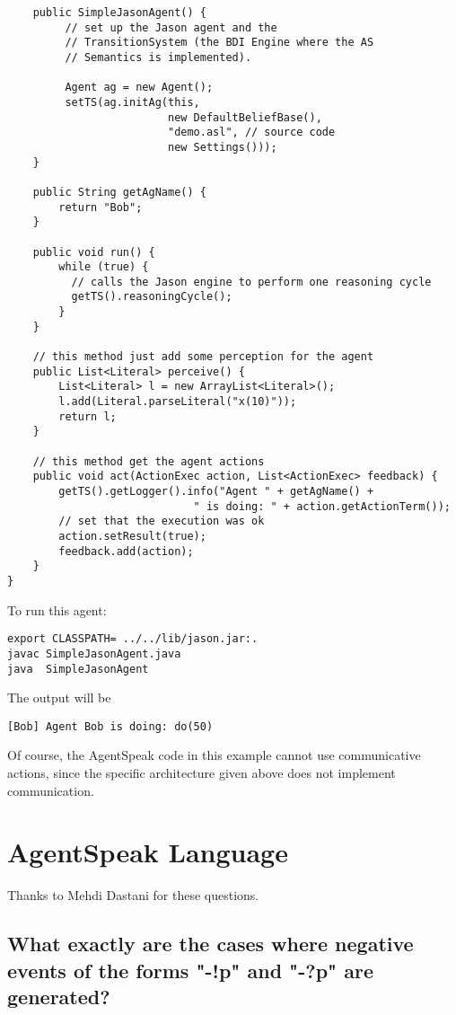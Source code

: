 \documentclass{article}
\begin{document}
\begin{description}
\begin{verbatim}
    public SimpleJasonAgent() {
         // set up the Jason agent and the 
         // TransitionSystem (the BDI Engine where the AS 
         // Semantics is implemented).

         Agent ag = new Agent();
         setTS(ag.initAg(this, 
                         new DefaultBeliefBase(), 
                         "demo.asl", // source code
                         new Settings()));
    }
    
    public String getAgName() {
        return "Bob";
    }

    public void run() {
        while (true) {
          // calls the Jason engine to perform one reasoning cycle
          getTS().reasoningCycle();
        }
    }

    // this method just add some perception for the agent
    public List<Literal> perceive() {
        List<Literal> l = new ArrayList<Literal>();
        l.add(Literal.parseLiteral("x(10)"));
        return l;
    }

    // this method get the agent actions
    public void act(ActionExec action, List<ActionExec> feedback) {
        getTS().getLogger().info("Agent " + getAgName() + 
                             " is doing: " + action.getActionTerm());
        // set that the execution was ok
        action.setResult(true);
        feedback.add(action);
    }
}
\end{verbatim}

To run this agent:
\begin{verbatim}
export CLASSPATH= ../../lib/jason.jar:.
javac SimpleJasonAgent.java
java  SimpleJasonAgent
\end{verbatim}

The output will be 
\begin{verbatim}
[Bob] Agent Bob is doing: do(50)
\end{verbatim}

Of course, the AgentSpeak code in this example cannot use communicative
actions, since the specific architecture given above does not implement
communication.

\section{AgentSpeak Language}

Thanks to Mehdi Dastani for these questions.

\subsection{What exactly are the cases where negative events of the forms
  "-!p" and "-?p" are generated?}


\end{description}
\end{document}
